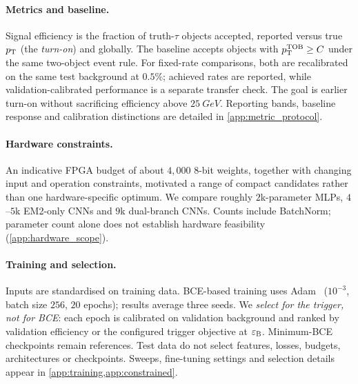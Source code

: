 \paragraph{Metrics and baseline.}
Signal efficiency is the fraction of truth-$\tau$ objects accepted, reported versus true $p_{\mathrm{T}}$ (the \emph{turn-on}) and globally. The baseline accepts objects with $p_{\mathrm{T}}^{\mathrm{TOB}}\geq C$ under the same two-object event rule. For fixed-rate comparisons, both are recalibrated on the same test background at $0.5\%$; achieved rates are reported, while validation-calibrated performance is a separate transfer check. The goal is earlier turn-on without sacrificing efficiency above $\SI{25}{GeV}$. Reporting bands, baseline response and calibration distinctions are detailed in \cref{app:metric_protocol}.

\paragraph{Hardware constraints.}
An indicative FPGA budget of about $4{,}000$ 8-bit weights, together with changing input and operation constraints, motivated a range of compact candidates rather than one hardware-specific optimum. We compare roughly $2$k-parameter MLPs, $4$--$5$k EM2-only CNNs and $9$k dual-branch CNNs. Counts include BatchNorm; parameter count alone does not establish hardware feasibility (\cref{app:hardware_scope}).

\paragraph{Training and selection.}
Inputs are standardised on training data. BCE-based training uses Adam~\cite{kingma2015adam} ($10^{-3}$, batch size $256$, $20$ epochs); results average three seeds. We \emph{select for the trigger, not for BCE}: each epoch is calibrated on validation background and ranked by validation efficiency or the configured trigger objective at $\varepsilon_{\mathrm{B}}$. Minimum-BCE checkpoints remain references. Test data do not select features, losses, budgets, architectures or checkpoints. Sweeps, fine-tuning settings and selection details appear in \cref{app:training,app:constrained}.
